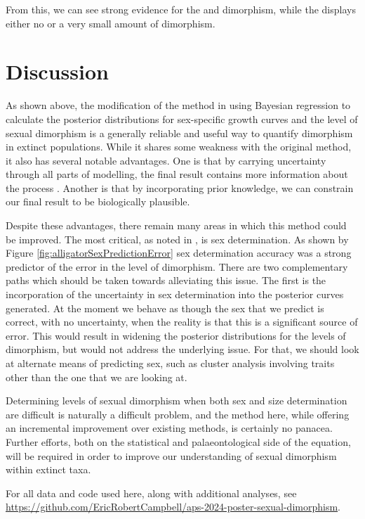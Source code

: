 \documentclass[letterpaper]{article}
\begin{document}
From this, we can see strong evidence for the \maia{} and \psit{} dimorphism, while the \tyran{} displays either no or a very small amount of dimorphism.

\section{Discussion}

As shown above, the modification of the method in \cite{saittaEffectSizeStatistical2020} using Bayesian regression to calculate the posterior distributions for sex-specific growth curves and the level of sexual dimorphism is a generally reliable and useful way to quantify dimorphism in extinct populations. While it shares some weakness with the original method, it also has several notable advantages. One is that by carrying uncertainty through all parts of modelling, the final result contains more information about the process \parencite{mcelreathStatisticalRethinkingBayesian2020}. Another is that by incorporating prior knowledge, we can constrain our final result to be biologically plausible.

Despite these advantages, there remain many areas in which this method could be improved. The most critical, as noted in \cite{saittaEffectSizeStatistical2020}, is sex determination. As shown by Figure \ref{fig:alligatorSexPredictionError} sex determination accuracy was a strong predictor of the error in the level of dimorphism. There are two complementary paths which should be taken towards alleviating this issue. The first is the incorporation of the uncertainty in sex determination into the posterior curves generated. At the moment we behave as though the sex that we predict is correct, with no uncertainty, when the reality is that this is a significant source of error. This would result in widening the posterior distributions for the levels of dimorphism, but would not address the underlying issue. For that, we should look at alternate means of predicting sex, such as cluster analysis involving traits other than the one that we are looking at.

Determining levels of sexual dimorphism when both sex and size determination are difficult is naturally a difficult problem, and the method here, while offering an incremental improvement over existing methods, is certainly no panacea. Further efforts, both on the statistical and palaeontological side of the equation, will be required in order to improve our understanding of sexual dimorphism within extinct taxa.


\printbibliography[title=Bibliography]
For all data and code used here, along with additional analyses, see \url{https://github.com/EricRobertCampbell/aps-2024-poster-sexual-dimorphism}.
\end{document}
